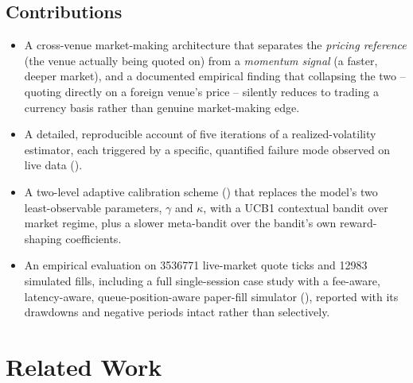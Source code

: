 \documentclass[11pt,a4paper]{article}
\begin{document}
\subsection{Contributions}
\begin{itemize}
  \item A cross-venue market-making architecture that separates the \emph{pricing reference}
        (the venue actually being quoted on) from a \emph{momentum signal} (a faster, deeper
        market), and a documented empirical finding that collapsing the two -- quoting directly
        on a foreign venue's price -- silently reduces to trading a currency basis rather than
        genuine market-making edge.
  \item A detailed, reproducible account of five iterations of a realized-volatility estimator,
        each triggered by a specific, quantified failure mode observed on live data ().
  \item A two-level adaptive calibration scheme () that replaces the model's two
        least-observable parameters, $\gamma$ and $\kappa$, with a UCB1 contextual bandit
        \cite{auer2002} over market regime, plus a slower meta-bandit over the bandit's own
        reward-shaping coefficients.
  \item An empirical evaluation on \num{3536771} live-market quote ticks and \num{12983} simulated
        fills, including a full single-session case study with a fee-aware, latency-aware,
        queue-position-aware paper-fill simulator (), reported with its
        drawdowns and negative periods intact rather than selectively.
\end{itemize}

\section{Related Work}
\end{document}
